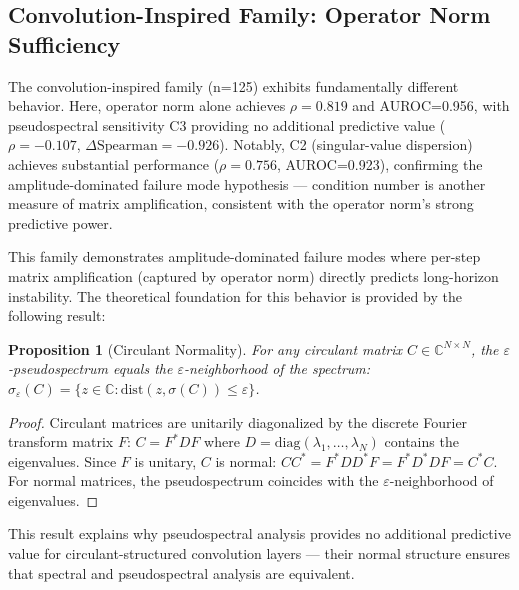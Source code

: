 \documentclass[twoside]{article}
\newtheorem{proposition}{Proposition}
\begin{document}
\subsection{Convolution-Inspired Family: Operator Norm Sufficiency}
\label{sec:convolution}

The convolution-inspired family (n=125) exhibits fundamentally different behavior. Here, operator norm alone achieves $\rho=0.819$ and AUROC=0.956, with pseudospectral sensitivity C3 providing no additional predictive value ($\rho=-0.107$, $\Delta\text{Spearman}=-0.926$). Notably, C2 (singular-value dispersion) achieves substantial performance ($\rho=0.756$, AUROC=0.923), confirming the amplitude-dominated failure mode hypothesis — condition number is another measure of matrix amplification, consistent with the operator norm's strong predictive power.

This family demonstrates amplitude-dominated failure modes where per-step matrix amplification (captured by operator norm) directly predicts long-horizon instability. The theoretical foundation for this behavior is provided by the following result:

\begin{proposition}[Circulant Normality]
For any circulant matrix $C \in \mathbb{C}^{N \times N}$, the $\varepsilon$-pseudospectrum equals the $\varepsilon$-neighborhood of the spectrum: $\sigma_{\varepsilon}(C) = \{z \in \mathbb{C} : \text{dist}(z, \sigma(C)) \leq \varepsilon\}$.
\end{proposition}

\begin{proof}
Circulant matrices are unitarily diagonalized by the discrete Fourier transform matrix $F$: $C = F^*DF$ where $D = \text{diag}(\lambda_1, \ldots, \lambda_N)$ contains the eigenvalues. Since $F$ is unitary, $C$ is normal: $CC^* = F^*D D^*F = F^*D^*DF = C^*C$. For normal matrices, the pseudospectrum coincides with the $\varepsilon$-neighborhood of eigenvalues.
\end{proof}

This result explains why pseudospectral analysis provides no additional predictive value for circulant-structured convolution layers — their normal structure ensures that spectral and pseudospectral analysis are equivalent.
\end{document}

